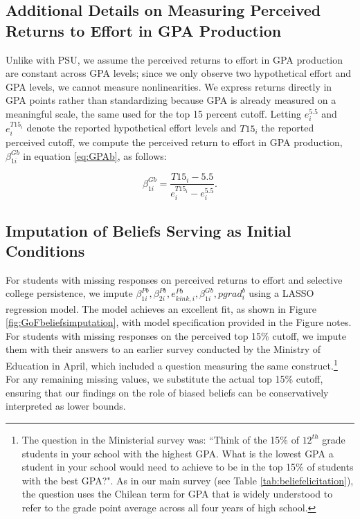 

\subsection{Additional Details on Measuring Perceived Returns to Effort in GPA Production}\label{sec:appendixGPAreturns}
Unlike with PSU, we assume the perceived returns to effort in GPA production are constant across GPA levels; since we only observe two hypothetical effort and GPA levels, we cannot measure nonlinearities. We express returns directly in GPA points rather than standardizing because GPA is already measured on a meaningful scale, the same used for the top 15 percent cutoff. Letting $e_i^{5.5}$ and $e_i^{T15_i}$ denote the reported hypothetical effort levels and $T15_i$ the reported perceived cutoff, we compute the perceived return to effort in GPA production, $\beta_{1i}^{Gb}$ in equation \eqref{eq:GPAb}, as follows: 

\begin{equation}\label{eq:GPAbreturns}
    \beta_{1i}^{Gb}=\frac{T15_i-5.5}{e_i^{T15_i}-e_i^{5.5}}.
\end{equation}

\subsection{Imputation of Beliefs Serving as Initial Conditions}\label{ref:imputation}
For students with missing responses on perceived returns to effort and selective college persistence, we impute $\beta_{1i}^{Pb},\beta_{2i}^{Pb},e_{kink,i}^{Pb},\beta_{1i}^{Gb},pgrad_i^b$ using a LASSO regression model. The model achieves an excellent fit, as shown in Figure \ref{fig:GoFbeliefsimputation}, with model specification provided in the Figure notes. For students with missing responses on the perceived top 15\% cutoff, we impute them with their answers to an earlier survey conducted by the Ministry of Education in April, which included a question measuring the same construct.\footnote{The question in the Ministerial survey was: ``Think of the 15\% of $12^{th}$ grade students in your school with the highest GPA. What is the lowest GPA a student in your school would need to achieve to be in the top 15\% of students with the best GPA?". As in our main survey (see Table \ref{tab:beliefelicitation}), the question uses the Chilean term for GPA that is widely understood to refer to the grade point average across all four years of high school. } For any remaining missing values, we substitute the actual top 15\% cutoff, ensuring that our findings on the role of biased beliefs can be conservatively interpreted as lower bounds.


